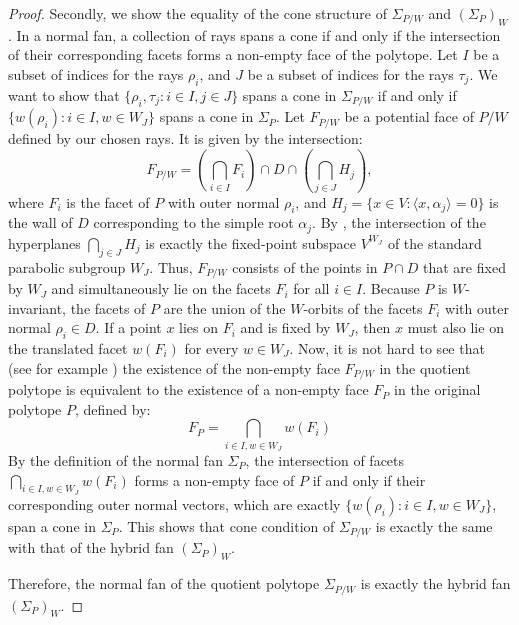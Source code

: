\documentclass{amsart}
\theoremstyle{definition}
\theoremstyle{remark}
\numberwithin{equation}{section}
\begin{document}
\begin{proof}
Secondly, we show the equality of the cone structure of $\Sigma_{P/W}$ and $(\Sigma_P)_W$. In a normal fan, a collection of rays spans a cone if and only if the intersection of their corresponding facets forms a non-empty face of the polytope. Let $I$ be a subset of indices for the rays $\rho_i$, and $J$ be a subset of indices for the rays $\tau_j$. We want to show that $\{\rho_i, \tau_j : i \in I, j \in J\}$ spans a cone in $\Sigma_{P/W}$ if and only if $\{ w(\rho_i) : i \in I, w \in W_J \}$ spans a cone in $\Sigma_P$. Let $F_{P/W}$ be a potential face of $P/W$ defined by our chosen rays. It is given by the intersection: $$F_{P/W} = \left( \bigcap_{i \in I} F_i \right) \cap D \cap\left( \bigcap_{j \in J} H_j \right),$$ where $F_i$ is the facet of $P$ with outer normal $\rho_i$, and $H_j = \{x \in V : \langle x, \alpha_j \rangle = 0\}$ is the wall of $D$ corresponding to the simple root $\alpha_j$. By \cite[Proposition 1.15]{Humphreys90}, the intersection of the hyperplanes $\bigcap_{j \in J} H_j$ is exactly the fixed-point subspace $V^{W_J}$ of the standard parabolic subgroup $W_J$. Thus, $F_{P/W}$ consists of the points in $P \cap D$ that are fixed by $W_J$ and simultaneously lie on the facets $F_i$ for all $i \in I$. Because $P$ is $W$-invariant, the facets of $P$ are the union of the $W$-orbits of the facets $F_i$ with outer normal $\rho_i \in D$. If a point $x$ lies on $F_i$ and is fixed by $W_J$, then $x$ must also lie on the translated facet $w(F_i)$ for every $w \in W_J$. Now, it is not hard to see that (see for example \cite[Proposition 2.4]{gong2026invariants}) the existence of the non-empty face $F_{P/W}$ in the quotient polytope is equivalent to the existence of a non-empty face $F_P$ in the original polytope $P$, defined by:
    $$F_P = \bigcap_{i \in I, w \in W_J} w(F_i)$$
By the definition of the normal fan $\Sigma_P$, the intersection of facets $\bigcap_{i \in I, w \in W_J} w(F_i)$ forms a non-empty face of $P$ if and only if their corresponding outer normal vectors, which are exactly $\{ w(\rho_i) : i \in I, w \in W_J \}$, span a cone in $\Sigma_P$. This shows that cone condition of $\Sigma_{P/W}$ is exactly the same with that of the hybrid fan $(\Sigma_P)_W$. 

Therefore, the normal fan of the quotient polytope $\Sigma_{P/W}$ is exactly the hybrid fan $(\Sigma_P)_W$.
\end{proof}
\end{document}
